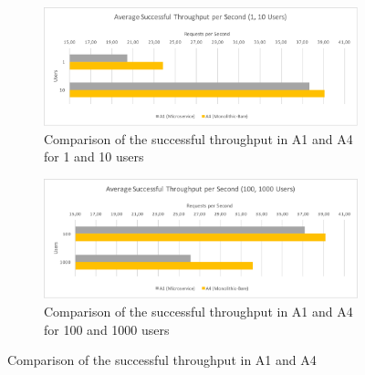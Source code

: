 \documentclass[a4paper,oneside]{bth}
\begin{document}
\begin{figure}[h]
\begin{center}

\begin{subfigure}[b]{1\textwidth}
\includegraphics[width=13cm]{Graph/rq1-stps-1}
\caption{Comparison of the successful throughput in A1 and A4 for 1 and 10 users}
\end{subfigure}

\begin{subfigure}[b]{1\textwidth}
\includegraphics[width=13cm]{Graph/rq1-stps-2}
\caption{Comparison of the successful throughput in A1 and A4 for 100 and 1000 users}
\end{subfigure}

\caption{Comparison of the successful throughput in A1 and A4}
\label{rq1-stps}

\end{center}
\end{figure}
\end{document}
